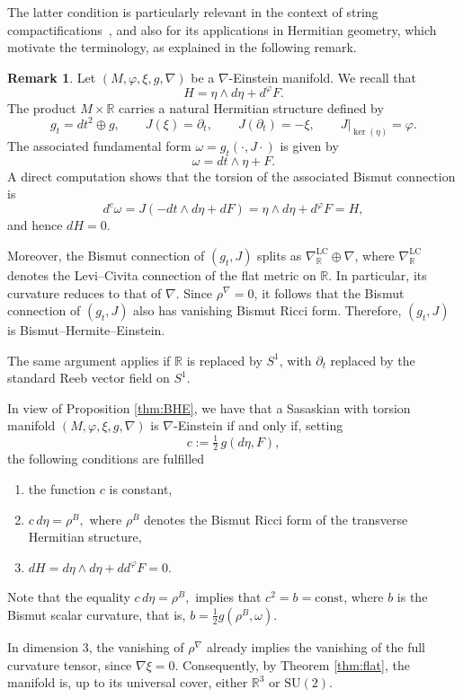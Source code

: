 \documentclass{article}
\theoremstyle{definition}
\newtheorem{rmk}[thm]{Remark}
\newcommand{\R}{\mathbb{R}}
\renewcommand{\phi}{\varphi}
\numberwithin{equation}{section}
\begin{document}
The latter condition is particularly relevant in the context of string compactifications~\cite{PT}, and also for its applications in Hermitian geometry, which motivate the terminology, as explained in the following remark.
 \begin{rmk} \label{rmk:oddeven}
Let $(M,\phi,\xi,g,\nabla)$ be a $\nabla$-Einstein manifold. We recall that
\[
H = \eta \wedge d\eta + d^\phi F.
\]
The product $M \times \mathbb{R}$ carries a natural Hermitian structure defined by
\[
g_t = dt^2 \oplus g, \qquad J(\xi) = \partial_t, \qquad J(\partial_t) = -\xi, \qquad J|_{\ker(\eta)} = \phi.
\]
The associated fundamental form $\omega = g_t(\cdot, J\cdot)$ is given by
\[
\omega = dt \wedge \eta + F.
\]
A direct computation shows that the torsion of the associated Bismut connection is
\[
d^c \omega = J(-dt \wedge d\eta + dF) = \eta \wedge d\eta + d^\phi F = H,
\]
and hence $dH = 0$.

Moreover, the Bismut connection of $(g_t,J)$ splits as $\nabla^{\mathrm{LC}}_{\mathbb{R}} \oplus \nabla$, where $\nabla^{\mathrm{LC}}_{\mathbb{R}}$ denotes the Levi--Civita connection of the flat metric on $\mathbb{R}$. In particular, its curvature reduces to that of $\nabla$. Since $\rho^\nabla = 0$, it follows that the Bismut connection of $(g_t,J)$ also has vanishing Bismut Ricci form. Therefore, $(g_t,J)$ is Bismut--Hermite--Einstein.

The same argument applies if $\mathbb{R}$ is replaced by $S^1$, with $\partial_t$ replaced by the standard Reeb vector field on $S^1$.
\end{rmk}
In view of Proposition \ref{thm:BHE}, we have that a Sasaskian with torsion manifold $(M,\phi,\xi,g, \nabla)$ is $\nabla$-Einstein if and only if, setting
\[
c := \tfrac12\, g(d\eta, F),
\]
the following conditions are fulfilled
\begin{enumerate}
    \item the function $c$ is constant,
    \item $c\, d\eta = \rho^B,$ where $\rho^B$ denotes the Bismut Ricci form of the transverse Hermitian structure,
    \item $dH=d\eta \wedge d\eta+ dd^\phi F=0$.
\end{enumerate}
Note that the equality $c\, d\eta = \rho^B,$ implies that $c^2=b=\text{const}$, where $b$ is the Bismut scalar curvature, that is, $b=\tfrac{1}{2} g(\rho^B, \omega)$. \par

\medskip
In dimension 3, the vanishing of $\rho^\nabla$ already implies the vanishing of the full curvature tensor, since $\nabla \xi=0$. Consequently, by Theorem \ref{thm:flat}, the manifold is, up to its universal cover, either $\R^3$ or $\mathrm{SU}(2)$.
\end{document}
